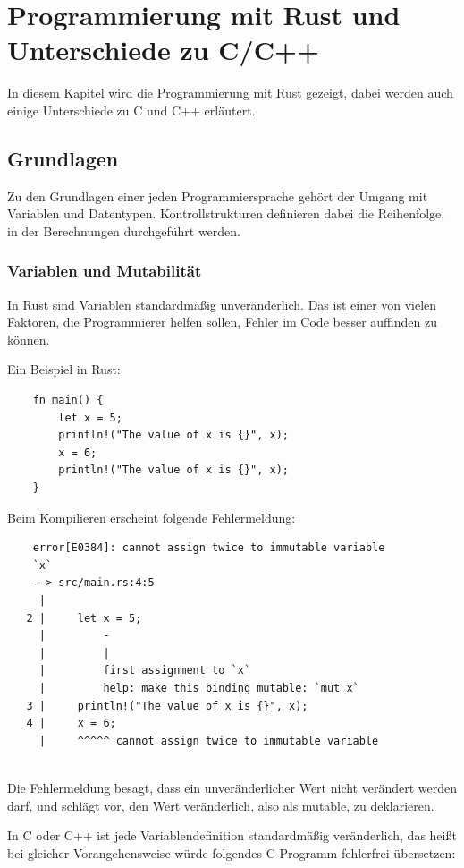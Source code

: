 \chapter{Programmierung mit Rust und Unterschiede zu C/C++}

In diesem Kapitel wird die Programmierung mit Rust gezeigt, dabei werden auch einige Unterschiede zu C und C++ erläutert.


\section{Grundlagen}

Zu den Grundlagen einer jeden Programmiersprache gehört der Umgang mit Variablen und Datentypen. Kontrollstrukturen definieren dabei die Reihenfolge, in der Berechnungen durchgeführt werden.

\subsection{Variablen und Mutabilität}

In Rust sind Variablen standardmäßig unveränderlich. Das ist einer von vielen Faktoren, die Programmierer helfen sollen, Fehler im Code besser auffinden zu können. \cite{RustBook}

Ein Beispiel in Rust:

\begin{lstlisting}
    fn main() {
        let x = 5;
        println!("The value of x is {}", x);
        x = 6;
        println!("The value of x is {}", x);
    }
\end{lstlisting}

Beim Kompilieren erscheint folgende Fehlermeldung:

\begin{lstlisting}
    error[E0384]: cannot assign twice to immutable variable 
    `x`
    --> src/main.rs:4:5
     |
   2 |     let x = 5;
     |         -
     |         |
     |         first assignment to `x`
     |         help: make this binding mutable: `mut x`
   3 |     println!("The value of x is {}", x);
   4 |     x = 6;
     |     ^^^^^ cannot assign twice to immutable variable
   
\end{lstlisting}

Die Fehlermeldung besagt, dass ein unveränderlicher Wert nicht verändert werden darf, und schlägt vor, den Wert veränderlich, also als \glqq mutable\grqq{}, zu deklarieren.

In C oder C++ ist jede Variablendefinition standardmäßig veränderlich, das heißt bei gleicher Vorangehensweise würde folgendes C-Programm fehlerfrei übersetzen:

